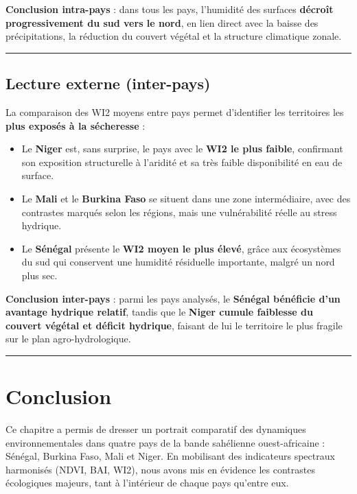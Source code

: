 \documentclass[
]{book}
\begin{document}
\textbf{Conclusion intra-pays} : dans tous les pays, l'humidité des surfaces \textbf{décroît progressivement du sud vers le nord}, en lien direct avec la baisse des précipitations, la réduction du couvert végétal et la structure climatique zonale.

\begin{center}\rule{0.5\linewidth}{0.5pt}\end{center}

\subsection{Lecture externe (inter-pays)}\label{lecture-externe-inter-pays-2}

La comparaison des WI2 moyens entre pays permet d'identifier les territoires les \textbf{plus exposés à la sécheresse} :

\begin{itemize}
\item
  Le \textbf{Niger} est, sans surprise, le pays avec le \textbf{WI2 le plus faible}, confirmant son exposition structurelle à l'aridité et sa très faible disponibilité en eau de surface.
\item
  Le \textbf{Mali} et le \textbf{Burkina Faso} se situent dans une zone intermédiaire, avec des contrastes marqués selon les régions, mais une vulnérabilité réelle au stress hydrique.
\item
  Le \textbf{Sénégal} présente le \textbf{WI2 moyen le plus élevé}, grâce aux écosystèmes du sud qui conservent une humidité résiduelle importante, malgré un nord plus sec.
\end{itemize}

\textbf{Conclusion inter-pays} : parmi les pays analysés, le \textbf{Sénégal bénéficie d'un avantage hydrique relatif}, tandis que le \textbf{Niger cumule faiblesse du couvert végétal et déficit hydrique}, faisant de lui le territoire le plus fragile sur le plan agro-hydrologique.

\begin{center}\rule{0.5\linewidth}{0.5pt}\end{center}

\section{Conclusion}\label{conclusion-4}

Ce chapitre a permis de dresser un portrait comparatif des dynamiques environnementales dans quatre pays de la bande sahélienne ouest-africaine : Sénégal, Burkina Faso, Mali et Niger. En mobilisant des indicateurs spectraux harmonisés (NDVI, BAI, WI2), nous avons mis en évidence les contrastes écologiques majeurs, tant à l'intérieur de chaque pays qu'entre eux.
\end{document}
